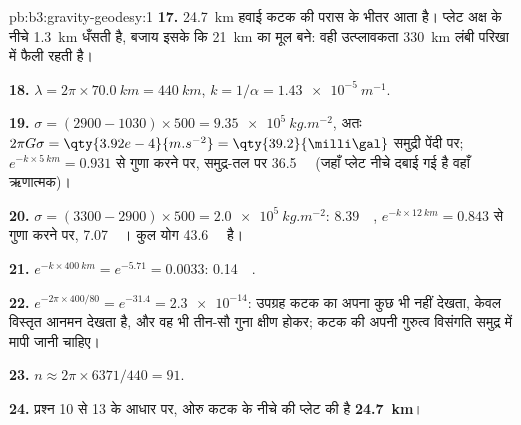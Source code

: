 \begin{solution}{pb:b3:gravity-geodesy:1}
\textbf{17.} \qty{24.7}{km} हवाई कटक की परास के भीतर आता है। प्लेट
अक्ष के नीचे \qty{1.3}{km} धँसती है, बजाय इसके कि \qty{21}{km} का मूल बने: वही
उत्प्लावकता \qty{330}{km} लंबी परिखा में फैली रहती है।

\textbf{18.} $\lambda = 2\pi\times\qty{70.0}{km} = \qty{440}{km}$,
$k = 1/\alpha = \qty{1.43e-5}{m^{-1}}$.

\textbf{19.} $\sigma = (2900 - 1030)\times500 = \qty{9.35e5}{kg.m^{-2}}$, अतः
$2\pi G\sigma = \qty{3.92e-4}{m.s^{-2}} = \qty{39.2}{\milli\gal}$ समुद्री पेंदी पर;
$e^{-k\times\qty{5}{km}} = 0.931$ से गुणा करने पर, समुद्र-तल पर \qty{36.5}{\milli\gal}
(जहाँ प्लेट नीचे दबाई गई है वहाँ ऋणात्मक)।

\textbf{20.} $\sigma = (3300 - 2900)\times500 = \qty{2.0e5}{kg.m^{-2}}$:
\qty{8.39}{\milli\gal}, $e^{-k\times\qty{12}{km}} = 0.843$ से गुणा करने पर,
\qty{7.07}{\milli\gal}। कुल योग \qty{43.6}{\milli\gal} है।

\textbf{21.} $e^{-k\times\qty{400}{km}} = e^{-5.71} = 0.0033$: \qty{0.14}{\milli\gal}.

\textbf{22.} $e^{-2\pi\times400/80} = e^{-31.4} = \num{2.3e-14}$: उपग्रह
कटक का अपना कुछ भी नहीं देखता, केवल विस्तृत आनमन देखता है, और वह भी
तीन-सौ गुना क्षीण होकर; कटक की अपनी गुरुत्व विसंगति समुद्र में मापी जानी चाहिए।

\textbf{23.} $n \approx 2\pi\times6371/440 = 91$.

\textbf{24.} प्रश्न 10 से 13 के आधार पर, ओरु कटक के नीचे की प्लेट की
 है
\textbf{\qty[text-series-to-math=true]{24.7}{km}}।
\end{solution}
